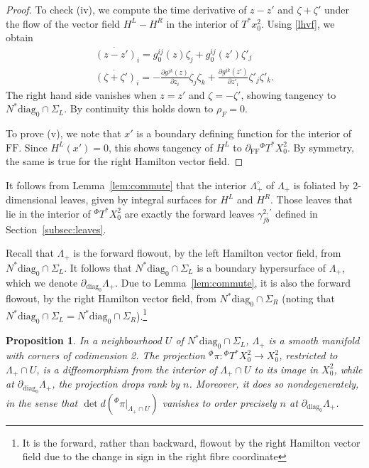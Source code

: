 \documentclass[10pt, a4paper, twoside]{amsart}
\numberwithin{equation}{section}
\newtheorem{proposition}[theorem]{Proposition}
\theoremstyle{remark}
\begin{document}
\begin{proof}
To check (iv), we compute the time derivative of $z - z'$ and $\zeta + \zeta'$ under the flow of the vector field
$H^L - H^R$ in the interior of $T^* x^2_0$. Using \eqref{lhvf}, we obtain
\begin{equation}\begin{gathered}
\dot {(z-z')}_i = g_0^{ij}(z) \zeta_j + g_0^{ij}(z') \zeta'_j \\
\dot {(\zeta + \zeta')}_i = - \frac{\partial g^{jk}(z)}{\partial z_i} \zeta_j \zeta_k + \frac{\partial g^{jk}(z')}{\partial z'_i} \zeta'_j \zeta'_k.
\end{gathered}\end{equation}
The right hand side vanishes when $z=z'$ and $\zeta = -\zeta'$, showing tangency to $N^* {\mathrm{diag}_0} \cap \Sigma_L$. By continuity this holds down to $\rho_F = 0$.

To prove (v), we note that $x'$ is a boundary defining function for the interior of ${\mathrm{FF}}$. Since $H^L(x') = 0$, this shows tangency of $H^L$ to $\partial_{\mathrm{FF}} {}^\Phi T^* X^2_0$. By symmetry, the same is true for the right Hamilton vector field.
\end{proof}

It follows from Lemma~\ref{lem:commute} that the interior $\Lambda_+^\circ$ of $\Lambda_+$ is foliated by 2-dimensional leaves, given by integral surfaces for $H^L$ and $H^R$. Those leaves that lie in the interior of ${}^\Phi T^* X^2_0$ are exactly the forward leaves ${\gamma^{2,\prime}_{fb}}$ defined in Section~\ref{subsec:leaves}. 

Recall that $\Lambda_+$ is the forward flowout, by the left Hamilton vector field, from $N^* {\mathrm{diag}_0} \cap \Sigma_L$.  It follows that $N^* {\mathrm{diag}_0} \cap \Sigma_L$ is a boundary hypersurface of $\Lambda_+$, which we denote $\partial_{\mathrm{diag}_0} \Lambda_+$. 
Due to Lemma~\ref{lem:commute}, it is also the forward flowout, by the right Hamilton vector field, from $N^* {\mathrm{diag}_0} \cap \Sigma_R$ (noting that $N^* {\mathrm{diag}_0} \cap \Sigma_L = N^* {\mathrm{diag}_0} \cap \Sigma_R$).\footnote{It is the forward, rather than backward, flowout by the right Hamilton vector field due to the change in sign in the right fibre coordinate}

\begin{proposition}\label{prop:nd}
In a neighbourhood $U$ of $N^* {\mathrm{diag}_0} \cap \Sigma_L$, $\Lambda_+$ is a smooth manifold with corners of codimension 2. The projection ${}^\Phi \pi: {}^\Phi T^* X^2_0 \to X^2_0$, restricted to $\Lambda_+ \cap U$, is a diffeomorphism from the interior of $\Lambda_+ \cap U$ to its image in $X^2_0$, while at  $\partial_{\mathrm{diag}_0} \Lambda_+$,  the projection drops rank by $n$. Moreover, it does so nondegenerately, in the sense that $\det d({}^\Phi\pi |_{\Lambda_+ \cap U})$ vanishes to order precisely $n$ at $\partial_{\mathrm{diag}_0} \Lambda_+$. 
\end{proposition}
\end{document}
